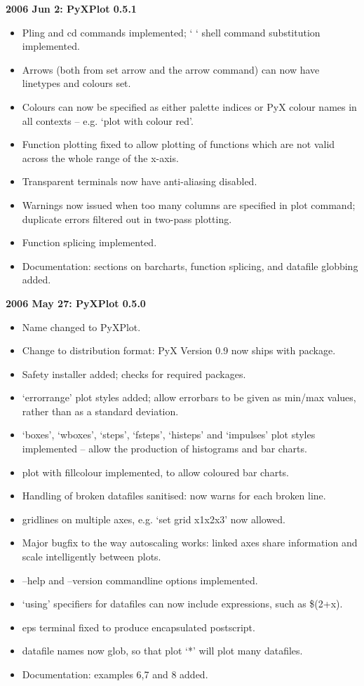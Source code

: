 \documentclass[a4paper,onecolumn,11pt]{book}
\begin{document}
\noindent \textbf{2006 Jun 2: PyXPlot 0.5.1}
\begin{itemize}
\item Pling and cd commands implemented; ` ` shell command substitution implemented.
\item Arrows (both from set arrow and the arrow command) can now have linetypes and colours set.
\item Colours can now be specified as either palette indices or PyX colour names in all contexts -- e.g. `plot with colour red'.
\item Function plotting fixed to allow plotting of functions which are not valid across the whole range of the x-axis.
\item Transparent terminals now have anti-aliasing disabled.
\item Warnings now issued when too many columns are specified in plot command; duplicate errors filtered out in two-pass plotting.
\item Function splicing implemented.
\item Documentation: sections on barcharts, function splicing, and datafile globbing added.
\end{itemize}

\noindent \textbf{2006 May 27: PyXPlot 0.5.0}
\begin{itemize}
\item Name changed to PyXPlot.
\item Change to distribution format: PyX Version 0.9 now ships with package.
\item Safety installer added; checks for required packages.
\item `errorrange' plot styles added; allow errorbars to be given as min/max values, rather than as a standard deviation.
\item `boxes', `wboxes', `steps', `fsteps', `histeps' and `impulses' plot styles implemented -- allow the production of histograms and bar charts.
\item plot with fillcolour implemented, to allow coloured bar charts.
\item Handling of broken datafiles sanitised: now warns for each broken line.
\item gridlines on multiple axes, e.g. `set grid x1x2x3' now allowed.
\item Major bugfix to the way autoscaling works: linked axes share information and scale intelligently between plots.
\item --help and --version commandline options implemented.
\item `using' specifiers for datafiles can now include expressions, such as \$(2+x).
\item eps terminal fixed to produce encapsulated postscript.
\item datafile names now glob, so that plot `*' will plot many datafiles.
\item Documentation: examples 6,7 and 8 added.
\end{itemize}
\end{document}
